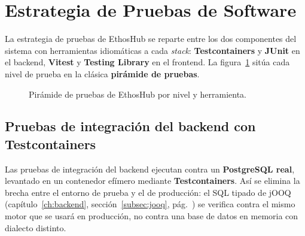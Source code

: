 \section{Estrategia de Pruebas de Software}
\label{sec:pruebas}

La estrategia de pruebas de EthosHub se reparte entre los dos componentes del sistema con
herramientas idiomáticas a cada \textit{stack}: \textbf{Testcontainers} y \textbf{JUnit}
en el backend, \textbf{Vitest} y \textbf{Testing Library} en el frontend. La
figura~\ref{fig:piramide} sitúa cada nivel de prueba en la clásica \textbf{pirámide de
pruebas}.

\vspace{0.3cm}
\begin{figure}[h!]
\centering
{}
\caption{Pirámide de pruebas de EthosHub por nivel y herramienta.}
\label{fig:piramide}
\end{figure}

\subsection{Pruebas de integración del backend con Testcontainers}
\label{subsec:testcontainers}

Las pruebas de integración del backend ejecutan contra un \textbf{PostgreSQL real},
levantado en un contenedor efímero mediante \textbf{Testcontainers}. Así se elimina la
brecha entre el entorno de prueba y el de producción: el SQL tipado de jOOQ
(capítulo~\ref{ch:backend}, sección~\ref{subsec:jooq}, pág.~\pageref{subsec:jooq}) se
verifica contra el mismo motor que se usará en producción, no contra una base de datos
en memoria con dialecto distinto.


